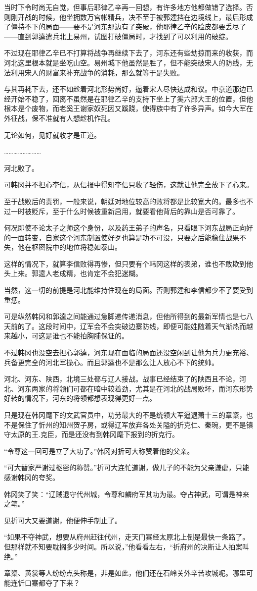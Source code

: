 当时下令时尚无自觉，但事后耶律乙辛再一回想，有许多地方他都做错了选择。否则刚开战的时候，他坐拥数万宫帐精兵，决不至于被郭逵挡在边境线上，最后形成了僵持不下的局面——要不是河东那边有了突破，他耶律乙辛的脸皮都要丢尽了——直到郭逵遣兵北上易州，试图打破僵局时，才找到了可以利用的破绽。

不过现在耶律乙辛已不打算将战争再继续下去了，河东还有些劫掠而来的收获，而河北这里根本就是坐吃山空。易州城下他虽然是胜了，但不能突破宋人的防线，无法利用宋人的财富来补充战争的消耗，那么就等于是失败。

与其再耗下去，还不如趁着河北形势尚好，逼着宋人尽快达成和议。中京道那边已经开始不稳了，回离不虽然是在耶律乙辛的支持下坐上了奚六部大王的位置，但他根本是个废物，而老奚王谢家奴死因又蹊跷，使得族中有了许多异声。如今大军在外征战，保不准就有人想趁机作乱。

无论如何，见好就收才是正道。

……………………

河北败了。

可韩冈并不担心李信，从信报中得知李信只收了轻伤，这就让他完全放下了心来。

至于战败后的责罚，一般来说，朝廷对地位较高的败将都是比较宽大的。最多也不过一时被贬斥，至于什么时候被重新启用，就要看他背后的靠山是否可靠了。

何况即使不论太子之师这个身份，以及药王弟子的声名，只看眼下河东战局正向好的一面转变，自家这个河东制置使好歹也算是功不可没，只要之后能稳住战果不失，他在枢密院中的地位将稳如泰山。

这样的情况下，就算李信败得再惨，但只要有个韩冈这样的表弟，谁也不敢欺到他头上来。郭逵人老成精，也肯定不会犯迷糊。

当然，这一切的前提是河北能维持住现在的局面。否则郭逵和李信都少不了要受到重惩。

可是纵然韩冈和郭逵之间能通过急脚递传递消息，但他所得到的最新军情也是七八天前的了。这段时间中，辽军会不会突破边寨防线，即便可能姓随着天气渐热而越来越小，可这是谁也不能拍胸脯保证的。

不过韩冈也没空去担心郭逵，河东现在面临的局面还没空闲到让他为兵力更充裕、兵备更完全的河北军操心。而且郭逵也不是那么让人放心不下的统帅。

河北、河东、陕西，北境三处都与辽人接战。战事已经结束了的陕西且不论，河北、河东两家的将领们可都在暗中较着劲，尤其是在河北的战局败坏，而河东形势好转的情况下，河东的将领都想表现得更好一点。

只是现在韩冈麾下的文武官员中，功劳最大的不是统领大军逼退萧十三的章楶，也不是保住了忻州的知州贺子房，或得辽军放弃各处关隘的折克仁、秦琬，更不是镇守太原的王.克臣，而是还没有到韩冈麾下报到的折克行。

“令尊这一回可是立了大功了。”韩冈对折可大称赞着他的父亲。

“可大替家严谢过枢密的称赞。”折可大连忙道谢，做儿子的不能为父亲谦虚，只能感谢韩冈的夸奖。

韩冈笑了笑：“辽贼退守代州城，令尊和麟府军其功为最。夺占神武，可谓是神来之笔。”

见折可大又要道谢，他便伸手制止了。

“如果不夺神武，想要从府州赶往代州，走天门寨经太原北上倒是最快一条路了。但那样就不知要耽搁多少时间。所以说，”他看看左右，“折府州的决断让人拍案叫绝。”

章楶、黄裳等人纷纷点头称是，非是如此，他们还在石岭关外辛苦攻城呢。哪里可能连忻口寨都夺了下来？
